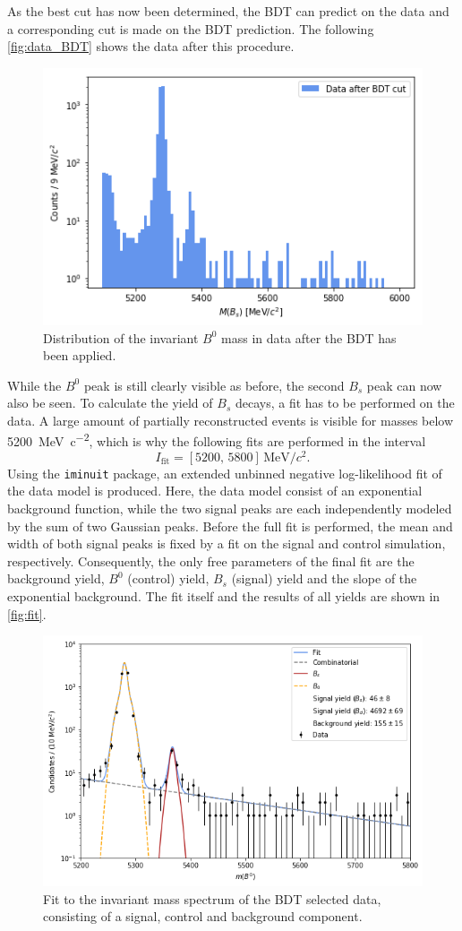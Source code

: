 As the best cut has now been determined, the BDT can predict on the data and a corresponding cut is made on the BDT prediction. The following \autoref{fig:data_BDT} shows the
data after this procedure.
\begin{figure}[H]
	\centering
	\includegraphics[width=0.5\linewidth]{plots/data_BDT.png}
	\caption{Distribution of the invariant $B^0$ mass in data after the BDT has been applied.}
	\label{fig:data_BDT}
\end{figure}
While the $B^0$ peak is still clearly visible as before, the second $B_s$ peak can now also be seen.
To calculate the yield of $B_s$ decays, a fit has to be performed on the data.
A large amount of partially reconstructed events is visible for masses below \qty{5200}{\mega\electronvolt\per c^2}, which is why the following fits are performed in the interval
\begin{equation*}
    I_\text{fit} = [5200, \, 5800] \, \si{\mega\electronvolt\per c^2}.
\end{equation*}
Using the \texttt{iminuit} \cite{iminuit} package, an extended unbinned negative log-likelihood fit of the data model is produced. Here, the data model consist of an
exponential background function, while the two signal peaks are each independently modeled by the sum of two Gaussian peaks. Before the full fit is performed, the mean and width
of both signal peaks is fixed by a fit on the signal and control simulation, respectively. Consequently, the only free parameters of the final fit are the background yield,
$B^0$ (control) yield, $B_s$ (signal) yield and the slope of the exponential background. The fit itself and the results of all yields are shown in \autoref{fig:fit}.
\begin{figure}[H]
	\centering
	\includegraphics[width=0.7\linewidth]{plots/data_fit.png}
	\caption{Fit to the invariant mass spectrum of the BDT selected data, consisting of a signal, control and background component.}
	\label{fig:fit}
\end{figure}

